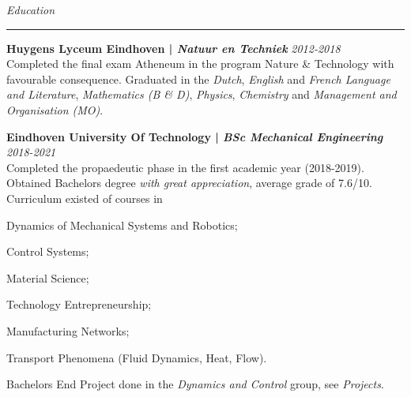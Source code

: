 \documentclass[12pt]{article}
\begin{document}


\textit{\huge{Education}} \\
\noindent\hfil\rule{\textwidth}{.4pt}\hfil

\textbf{Huygens Lyceum Eindhoven | \textit{Natuur en Techniek}} \hfill \textit{2012-2018}\\
Completed the final exam Atheneum in the program Nature \& Technology with favourable consequence. Graduated in the \textit{Dutch}, \textit{English} and \textit{French Language and Literature}, \textit{Mathematics (B \& D)}, \textit{Physics}, \textit{Chemistry} and \textit{Management and Organisation (MO)}.
\vspace{0.5cm}


\textbf{Eindhoven University Of Technology | \textit{BSc Mechanical Engineering}} \hfill \textit{2018-2021}\\
Completed the propaedeutic phase in the first academic year (2018-2019). Obtained Bachelors degree \textit{with great appreciation}, average grade of 7.6/10. Curriculum existed of courses in
\begin{compactitem}
    \item Dynamics of Mechanical Systems and Robotics;
    \item Control Systems;
    \item Material Science;
    \item Technology Entrepreneurship;
    \item Manufacturing Networks;
    \item Transport Phenomena (Fluid Dynamics, Heat, Flow).
\end{compactitem}
Bachelors End Project done in the \textit{Dynamics and Control} group, see \textit{Projects}.

\vspace{0.5cm}
\end{document}
